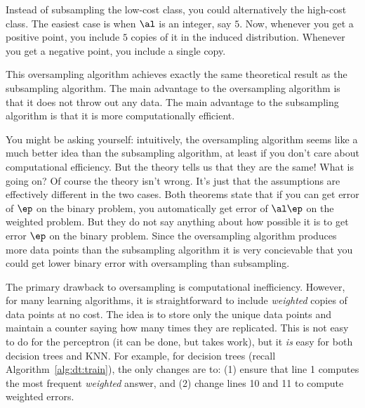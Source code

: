 Instead of subsampling the low-cost class, you could alternatively
 the high-cost class.  The easiest case is when
$\al$ is an integer, say $5$.  Now, whenever you get a positive point,
you include $5$ copies of it in the induced distribution.  Whenever
you get a negative point, you include a single copy.


This oversampling algorithm achieves exactly the same theoretical
result as the subsampling algorithm.  The main advantage to the
oversampling algorithm is that it does not throw out any data.  The
main advantage to the subsampling algorithm is that it is more
computationally efficient.


You might be asking yourself: intuitively, the oversampling algorithm
seems like a much better idea than the subsampling algorithm, at least
if you don't care about computational efficiency.  But the theory
tells us that they are the same!  What is going on?  Of course the
theory isn't wrong.  It's just that the assumptions are effectively
different in the two cases.  Both theorems state that if you can get
error of $\ep$ on the binary problem, you automatically get error of
$\al\ep$ on the weighted problem.  But they do not say anything about
how possible it is to get error $\ep$ on the binary problem.  Since
the oversampling algorithm produces more data points than the
subsampling algorithm it is very concievable that you could get lower
binary error with oversampling than subsampling.

The primary drawback to oversampling is computational inefficiency.
However, for many learning algorithms, it is straightforward to
include \emph{weighted} copies of data points at no cost.  The idea is
to store only the unique data points and maintain a counter saying how
many times they are replicated.  This is not easy to do for the
perceptron (it can be done, but takes work), but it \emph{is} easy for
both decision trees and KNN.  For example, for decision trees (recall
Algorithm~\ref{alg:dt:train}), the only changes are to: (1) ensure
that line 1 computes the most frequent \emph{weighted} answer, and (2)
change lines 10 and 11 to compute weighted errors.


